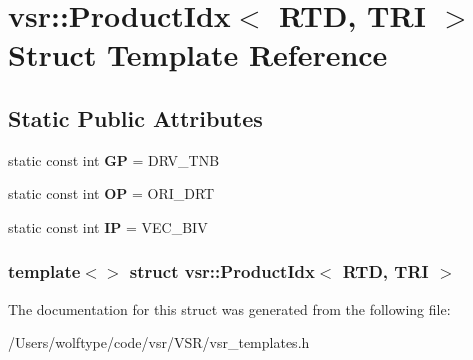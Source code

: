 \hypertarget{structvsr_1_1_product_idx_3_01_r_t_d_00_01_t_r_i_01_4}{\section{vsr\-:\-:Product\-Idx$<$ R\-T\-D, T\-R\-I $>$ Struct Template Reference}
\label{structvsr_1_1_product_idx_3_01_r_t_d_00_01_t_r_i_01_4}
}
\subsection*{Static Public Attributes}
\begin{DoxyCompactItemize}
\item 
\hypertarget{structvsr_1_1_product_idx_3_01_r_t_d_00_01_t_r_i_01_4_a4794c7ddfddfe6d46733f95367a573e4}{static const int {\bfseries G\-P} = D\-R\-V\-\_\-\-T\-N\-B}\label{structvsr_1_1_product_idx_3_01_r_t_d_00_01_t_r_i_01_4_a4794c7ddfddfe6d46733f95367a573e4}

\item 
\hypertarget{structvsr_1_1_product_idx_3_01_r_t_d_00_01_t_r_i_01_4_a6bb59e231446136eb9e16056c4a6ce50}{static const int {\bfseries O\-P} = O\-R\-I\-\_\-\-D\-R\-T}\label{structvsr_1_1_product_idx_3_01_r_t_d_00_01_t_r_i_01_4_a6bb59e231446136eb9e16056c4a6ce50}

\item 
\hypertarget{structvsr_1_1_product_idx_3_01_r_t_d_00_01_t_r_i_01_4_a1d1c8d9488c5613a4a56c5e1ab59908f}{static const int {\bfseries I\-P} = V\-E\-C\-\_\-\-B\-I\-V}\label{structvsr_1_1_product_idx_3_01_r_t_d_00_01_t_r_i_01_4_a1d1c8d9488c5613a4a56c5e1ab59908f}

\end{DoxyCompactItemize}
\subsubsection*{template$<$$>$ struct vsr\-::\-Product\-Idx$<$ R\-T\-D, T\-R\-I $>$}



The documentation for this struct was generated from the following file\-:\begin{DoxyCompactItemize}
\item 
/\-Users/wolftype/code/vsr/\-V\-S\-R/vsr\-\_\-templates.\-h\end{DoxyCompactItemize}
